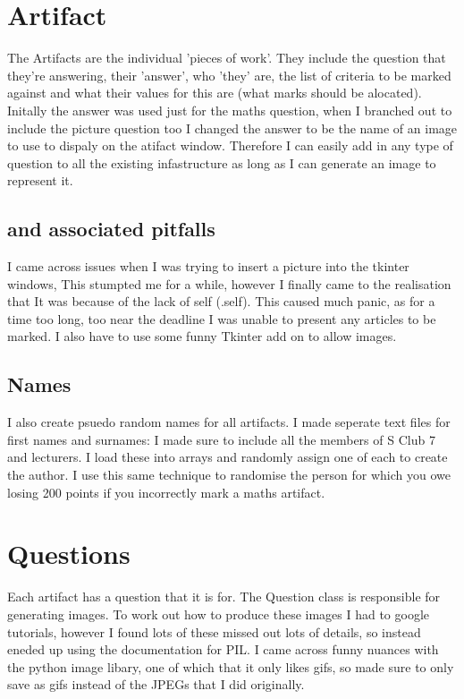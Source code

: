 \documentclass[twocolumn]{article}   %
\begin{document}
\section{Artifact}
The Artifacts are the individual 'pieces of work'. They include the question that they're answering, their 'answer', who 'they' are, the list of criteria to be marked against and what their values for this are (what marks should be alocated).
Initally the answer was used just for the maths question, when I branched out to include the picture question too I changed the answer to be the name of an image to use to dispaly on the atifact window. Therefore I can easily add in any type of question to all the existing infastructure as long as I can generate an image to represent it.
  \subsection{and associated pitfalls}
  I came across issues when I was trying to insert a picture into the tkinter windows, This stumpted me for a while, however I finally came to the realisation that It was because of the lack of self (.self). This caused much panic, as for a time too long, too near the deadline I was unable to present any articles to be marked. I also have to use some funny Tkinter add on to allow images.
  \subsection{Names}
  I also create psuedo random names for all artifacts. I made seperate text files for first names and surnames: I made sure to include all the members of S Club 7 and lecturers. I load these into arrays and randomly assign one of each to create the author. I use this same technique to randomise the person for which you owe losing 200 points if you incorrectly mark a maths artifact.

\section{Questions}
Each artifact has a question that it is for. The Question class is responsible for generating images. To work out how to produce these images I had to google tutorials, however I found lots of these missed out lots of details, so instead eneded up using the documentation for PIL\cite{PIL}. I came across funny nuances with the python image libary, one of which that it only likes gifs, so made sure to only save as gifs instead of the JPEGs that I did originally.
\end{document}
